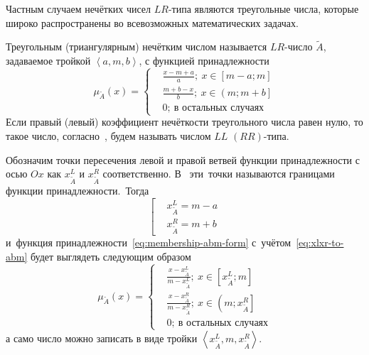 Частным случаем нечётких чисел $LR$-типа являются треугольные числа, которые широко распространены во всевозможных математических задачах.
\begin{mydef}
Треугольным (триангулярным) нечётким числом называется $LR$-число $\tilde{A}$, задаваемое тройкой $\left\langle a,m,b \right\rangle $, с функцией принадлежности
\begin{equation}
\label{eq:membership-abm-form}
	\mu_{\tilde A}\left( x \right)=
	\left\{ 
		\begin{aligned}
			& \frac{x-m+a}{a};\ x\in \left[ m-a;m \right] \\ 
			& \frac{m+b-x}{b};\ x\in \left( m;m+b \right] \\ 
			& 0;\ \text{в остальных случаях} 
	 	\end{aligned} 
	 \right.
\end{equation}
Если правый (левый) коэффициент нечёткости треугольного числа равен нулю, то такое число, согласно~\cite{Vorontsov_PI}, будем называть числом $LL$ $\left( RR \right)$-типа.
\end{mydef}

Обозначим точки пересечения левой и правой ветвей функции принадлежности с осью $Ox$ как $x_{{\tilde{A}}}^{L}$ и $x_{{\tilde{A}}}^{R}$ соответственно. В~\cite{Borisov_Krumberg_Riga} эти~точки называются границами функции принадлежности.~Тогда
\begin{equation}
\label{eq:xlxr-to-abm}
	\left[ 
		\begin{aligned}
			 & x_{\tilde A}^L=m-a \\ 
			 & x_{\tilde A}^R=m+b 
		 \end{aligned} 
 	\right.
\end{equation}
и~функция принадлежности~\eqref{eq:membership-abm-form} с~учётом~\eqref{eq:xlxr-to-abm} будет выглядеть следующим образом
\begin{equation}
\label{eq:membership-xlxr-form}
	\mu_{\tilde A}\left( x \right)=\left\{ 
	\begin{aligned}
		& \frac{x-x_{{\tilde{A}}}^{L}}{m-x_{{\tilde{A}}}^{L}};\ x\in \left[ x_{{\tilde{A}}}^{L};m \right] \\ 
		& \frac{x-x_{{\tilde{A}}}^{R}}{m-x_{{\tilde{A}}}^{R}};\ x\in \left( m;x_{{\tilde{A}}}^{R} \right] \\ 
		& 0;\ \text{в остальных случаях} 
	\end{aligned} 
	\right.
\end{equation}
а само число можно записать в виде тройки $\left\langle x_{{\tilde{A}}}^{L},m,x_{{\tilde{A}}}^{R} \right\rangle$.

